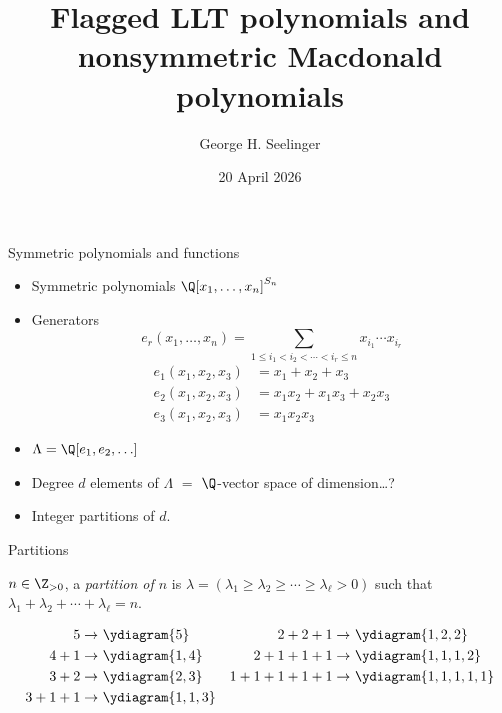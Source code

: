 \documentclass[dvipsnames]{beamer}
\title[]{Flagged LLT polynomials and nonsymmetric Macdonald polynomials} %
\author[George H. Seelinger]{George H. Seelinger} %
\institute[UMich] %
{
ghseeli@umich.edu\\ %
\medskip
UC Davis Algebra \& Discrete Mathematics Seminar \\ %
\medskip
joint work with Jonah Blasiak, Mark Haiman, Jennifer Morse, and Anna Pun
}
\date{20 April 2026} %
\theoremstyle{definition}
\newcounter{c}
\begin{document}
\begin{frame}
\titlepage %
\end{frame}
\begin{frame}{Symmetric polynomials and functions}
  \begin{itemize}
  \item Symmetric polynomials \(\Q[x_1,\ldots,x_n]^{S_n}\)
  \item Generators
    \[
       e_r(x_1,\ldots,x_n) = \sum_{1 \leq i_1 < i_2 <\cdots < i_r
      \leq n} x_{i_1} \cdots x_{i_r}
    \]
    \begin{align*}
      e_1(x_1,x_2,x_3) &= x_1 + x_2 + x_3  \\
      e_2(x_1,x_2,x_3) &= x_1 x_2 + x_1 x_3 + x_2 x_3\\
      e_3(x_1,x_2,x_3) &= x_1 x_2 x_3 
    \end{align*}
    \pause
  \item \(\Lambda = \Q[e_1,e_2,\ldots]\)\pause
  \item Degree \(d\) elements of \(\Lambda\) \(=\) \(\Q\)-vector
    space of dimension\ldots?\pause
  \item Integer partitions of \(d\).
  \end{itemize}
\end{frame}
\begin{frame}{Partitions}
    \begin{definition}
    \(n \in \Z_{>0}\), a \emph{partition of \(n\)} is
    \(\lambda = (\lambda_1 \geq
    \lambda_2 \geq \cdots \geq \lambda_\ell > 0)\) such that
    \(\lambda_1+\lambda_2 + \cdots + \lambda_\ell = n \).
  \end{definition}\pause
  \begin{align*}
    5 \to &\ \ydiagram{5} & 
    2+2+1 \to&\ \ydiagram{1,2,2}\\
    4+1 \to &\ \ydiagram{1,4}&
    2+1+1+1 \to&\ \ydiagram{1,1,1,2} \\
    3+2 \to &\ \ydiagram{2,3}&
    1+1+1+1+1 \to&\ \ydiagram{1,1,1,1,1}\\
    3+1+1 \to &\ \ydiagram{1,1,3}
  \end{align*}
\end{frame}
\end{document}
